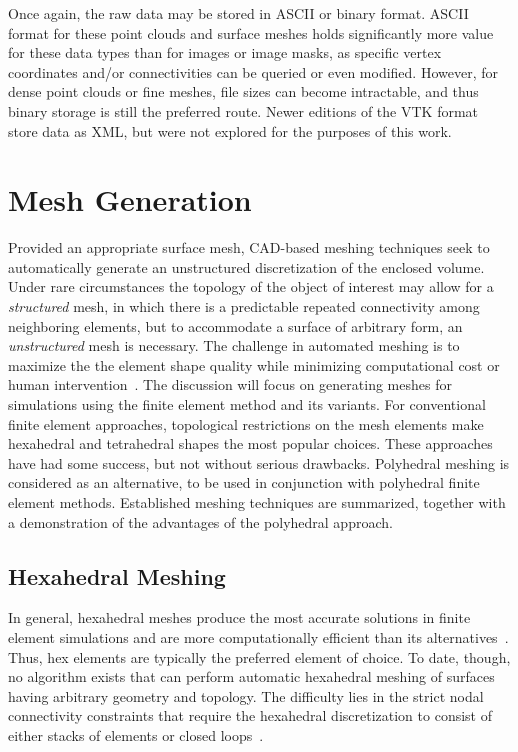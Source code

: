 Once again, the raw data may be stored in ASCII or binary format. ASCII format for these point clouds and surface meshes holds significantly more value for these data types than for images or image masks, as specific vertex coordinates and/or connectivities can be queried or even modified. However, for dense point clouds or fine meshes, file sizes can become intractable, and thus binary storage is still the preferred route. Newer editions of the VTK format store data as XML, but were not explored for the purposes of this work.

\section{Mesh Generation}
%
Provided an appropriate surface mesh, CAD-based meshing techniques seek to automatically generate an unstructured discretization of the enclosed volume. Under rare circumstances the topology of the object of interest may allow for a \textit{structured} mesh, in which there is a predictable repeated connectivity among neighboring elements, but to accommodate a surface of arbitrary form, an \textit{unstructured} mesh is necessary. The challenge in automated meshing is to maximize the the element shape quality while minimizing computational cost or human intervention~\cite{blacker_2001}. The discussion will focus on generating meshes for simulations using the finite element method and its variants. For conventional finite element approaches, topological restrictions on the mesh elements make hexahedral and tetrahedral shapes the most popular choices. These approaches have had some success, but not without serious drawbacks. Polyhedral meshing is considered as an alternative, to be used in conjunction with polyhedral finite element methods. Established meshing techniques are summarized, together with a demonstration of the advantages of the polyhedral approach.

\subsection{Hexahedral Meshing}
\label{Hexahedral Meshing}

In general, hexahedral meshes produce the most accurate solutions in finite element simulations and are more computationally efficient than its alternatives~\cite{tautges_2001}. Thus, hex elements are typically the preferred element of choice. To date, though, no algorithm exists that can perform automatic hexahedral meshing of surfaces having arbitrary geometry and topology. The difficulty lies in the strict nodal connectivity constraints that require the hexahedral discretization to consist of either stacks of elements or closed loops~\cite{young_2008}. 


